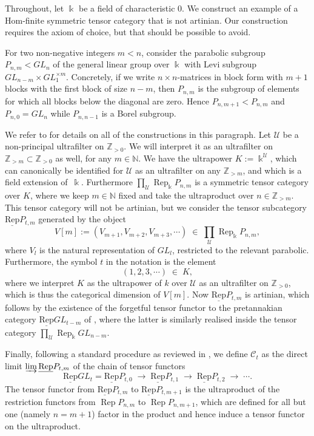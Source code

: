 \documentclass[11pt]{amsart}
\def\UU{\mathcal{U}}
\def\cC{\mathscr{C}}
\def\bk{\Bbbk}
\def\mZ{\mathbb{Z}}
\def\mN{\mathbb{N}}
\def\Rep{\operatorname{Rep}}
\def\uRep{\underline{\mathrm{Rep}}}
\theoremstyle{definition}
\theoremstyle{remark}
\numberwithin{equation}{section}
\begin{document}
Throughout, let $\bk$ be a field of characteristic 0. We construct an example of a Hom-finite symmetric tensor category that is not artinian. Our construction requires the axiom of choice, but that should be possible to avoid. 



For two non-negative integers $m< n$, consider the parabolic subgroup $P_{n,m}<GL_n$ of the general linear group over $\bk$ with Levi subgroup $GL_{n-m}\times GL_1^{\times m}$. Concretely, if we write $n\times n$-matrices in block form with $m+1$ blocks with the first block of size $n-m$, then $P_{n,m}$ is the subgroup of elements for which all blocks below the diagonal are zero. Hence $P_{n,m+1}<P_{n,m}$ and $P_{n,0}=GL_n$ while $P_{n,n-1}$ is a Borel subgroup.

We refer to \cite{Harman} for details on all of the constructions in this paragraph. Let $\UU$ be a non-principal ultrafilter on $\mZ_{>0}$. We will interpret it as an ultrafilter on $\mZ_{>m}\subset \mZ_{>0}$ as well, for any $m\in\mN$. We have the ultrapower $K:=\bk^{\UU}$, which can canonically be identified for $\UU$ as an ultrafilter on any $\mZ_{>m}$, and which is a field extension of~$\bk$. Furthermore $\prod_{\UU}\Rep_{\bk}P_{n,m}$ is a symmetric tensor category over $K$, where we keep $m\in\mN$ fixed and take the ultraproduct over $n\in\mZ_{> m}$. This tensor category will not be artinian, but we consider the tensor subcategory $\uRep P_{t,m}$ generated by the object
$$V[m]:=(V_{m+1},V_{m+2},V_{m+3},\cdots)\;\in\; \prod_{\UU}\Rep_{\bk}P_{n,m},$$
where $V_l$ is the natural representation of $GL_l$, restricted to the relevant parabolic. Furthermore, the symbol $t$ in the notation is the element 
$$(1,2,3,\cdots)\;\in\; K,$$
where we interpret $K$ as the ultrapower of $k$ over $\UU$ as an ultrafilter on $\mZ_{>0}$, which is thus the categorical dimension of $V[m]$. Now $\uRep P_{t,m}$ is artinian, which follows by the existence of the forgetful tensor functor to the pretannakian category $\uRep GL_{t-m}$ of \cite{Del07, EHS}, where the latter is similarly realised inside the tensor category $\prod_{\UU}\Rep_{\bk} GL_{n-m}$.

Finally, following a standard procedure as reviewed in \cite[\S 6]{CEO-A}, we define $\cC_t$ as the direct limit $\varinjlim \uRep P_{t,m}$ of the chain of tensor functors
$$\uRep GL_t= \uRep P_{t,0}\;\to\; \uRep P_{t,1}\;\to\;\uRep P_{t,2}\;\to\;\cdots.$$
The tensor functor from $\uRep P_{t,m}$ to $\uRep P_{t,m+1}$ is the ultraproduct of the restriction functors from $\Rep P_{n,m}$ to $\Rep P_{n,m+1}$, which are defined for all but one (namely $n=m+1$) factor in the product and hence induce a tensor functor on the ultraproduct.
\end{document}
